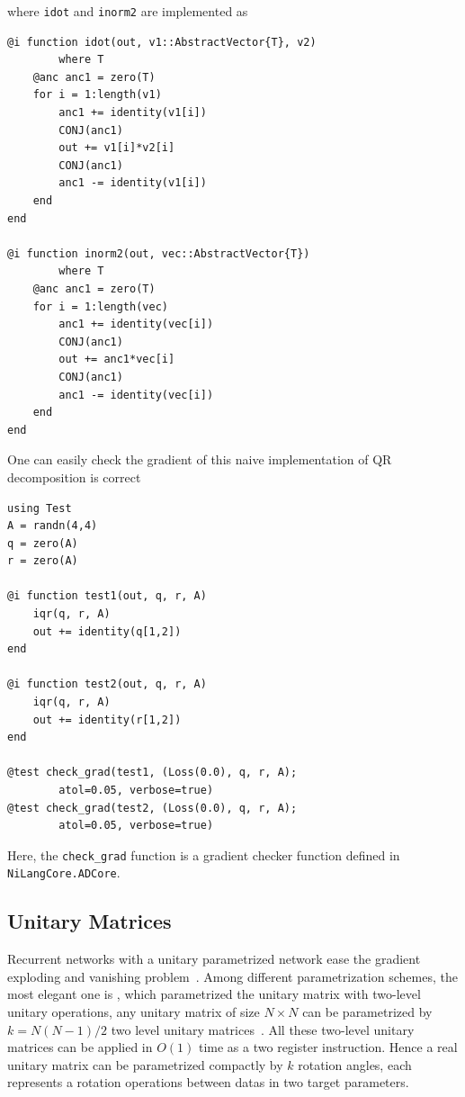 \documentclass[aps,twocolumn,longbibliography,english,superscriptaddress,prr]{revtex4-1}
\newcommand{\<}{\langle}
\renewcommand{\>}{\rangle}
\theoremstyle{definition}\newtheorem{definition}{\textit{Definition}}
\begin{document}
where \texttt{idot} and \texttt{inorm2} are implemented as

\begin{minipage}{.44\textwidth}
\begin{lstlisting}
@i function idot(out, v1::AbstractVector{T}, v2)
        where T
    @anc anc1 = zero(T)
    for i = 1:length(v1)
        anc1 += identity(v1[i])
        CONJ(anc1)
        out += v1[i]*v2[i]
        CONJ(anc1)
        anc1 -= identity(v1[i])
    end
end

@i function inorm2(out, vec::AbstractVector{T})
        where T
    @anc anc1 = zero(T)
    for i = 1:length(vec)
        anc1 += identity(vec[i])
        CONJ(anc1)
        out += anc1*vec[i]
        CONJ(anc1)
        anc1 -= identity(vec[i])
    end
end
\end{lstlisting}
\end{minipage}

One can easily check the gradient of this naive implementation of QR decomposition is correct

\begin{minipage}{.44\textwidth}
\begin{lstlisting}
using Test
A = randn(4,4)
q = zero(A)
r = zero(A)

@i function test1(out, q, r, A)
    iqr(q, r, A)
    out += identity(q[1,2])
end

@i function test2(out, q, r, A)
    iqr(q, r, A)
    out += identity(r[1,2])
end

@test check_grad(test1, (Loss(0.0), q, r, A);
        atol=0.05, verbose=true)
@test check_grad(test2, (Loss(0.0), q, r, A);
        atol=0.05, verbose=true)
\end{lstlisting}
\end{minipage}

Here, the \texttt{check\_grad} function is a gradient checker function defined in \texttt{NiLangCore.ADCore}.

\subsection{Unitary Matrices}
Recurrent networks with a unitary parametrized network ease the gradient exploding and vanishing problem~\cite{Arjovsky2015,Wisdom2016,Li2016}.
Among different parametrization schemes, the most elegant one is \cite{Li2016}, which parametrized the unitary matrix with two-level unitary operations, any unitary matrix of size $N\times N$ can be parametrized by $k = N(N-1)/2$ two level unitary matrices~\cite{Li2013}. All these two-level unitary matrices can be applied in $O(1)$ time as a two register instruction.
Hence a real unitary matrix can be parametrized compactly by $k$ rotation angles, each represents a rotation operations between datas in two target parameters.
\end{document}
